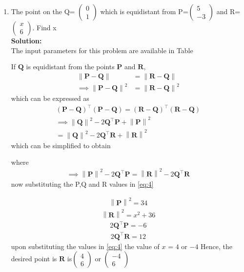 \documentclass[12pt]{article}
\providecommand{\brak}[1]{\ensuremath{\left(#1\right)}}
\providecommand{\norm}[1]{\left\lVert#1\right\rVert}
\newcommand{\solution}{\noindent \textbf{Solution: }}
\newcommand{\myvec}[1]{\ensuremath{\begin{pmatrix}#1\end{pmatrix}}}
\let\vec\mathbf
\begin{document}
\begin{enumerate}

\item The point on the Q= $\myvec{0\\ 1}$ which is equidistant from P=$\myvec{5 \\ -3}$ and R=$\myvec{x\\6}$. Find x\\

\solution \\The input parameters for this problem are available in Table
\begin{table}[ht!]

\caption{}
\label{Table-1}	
\end{table}


  If $\vec{Q}$  is  equidistant from the points $\vec{P}$ and $\vec{R}$, 
\begin{align}
 \norm{\vec{P}-\vec{Q}} &=
\norm{\vec{R}-\vec{Q}} 
\\
 \implies \norm{\vec{P}-\vec{Q}}^2 &=
\norm{\vec{R}-\vec{Q}}^2 
\end{align}
which can be expressed as 
\begin{multline}
 \brak{\vec{P}-\vec{Q}}^{\top} \brak{\vec{P}-\vec{Q}}=
 \brak{\vec{R}-\vec{Q}}^{\top} 
\brak{\vec{R}-\vec{Q}}
\\
 \implies \norm{\vec{Q}}^2-2{\vec{Q}}^{\top}\vec{P} + \norm{\vec{P}}^2
 \\= \norm{\vec{Q}}^2-2{\vec{Q}}^{\top}\vec{R} + \norm{\vec{R}}^2
\end{multline}
which can be simplified to obtain
  
  where 
  \begin{align}
   \implies \norm{\vec{P}}^2-2{\vec{Q}}^{\top}\vec{P} = \norm{\vec{R}}^2-2{\vec{Q}}^{\top}\vec{R} 
\label{eq:4} 
  \end{align}
  now substituting the P,Q and R values in \eqref{eq:4}

  \begin{align}
   \norm{\vec{P}}^2 = 34
    \end{align}
 \begin{align}
   \norm{\vec{R}}^2 = x^2+36
    \end{align}
  \begin{align}
 2{\vec{Q}}^{\top}\vec{P}= -6
\end{align}
\begin{align}
 2{\vec{Q}}^{\top}\vec{R}= 12
\end{align}
upon   substituting the values in \eqref{eq:4} the value of $x$ = $ 4$ or $-4$
Hence, the desired point is $\vec{R}$ is$\myvec{ 4 \\ 6}$ or $\myvec{-4\\6}$


\end{enumerate}
\end{document}
